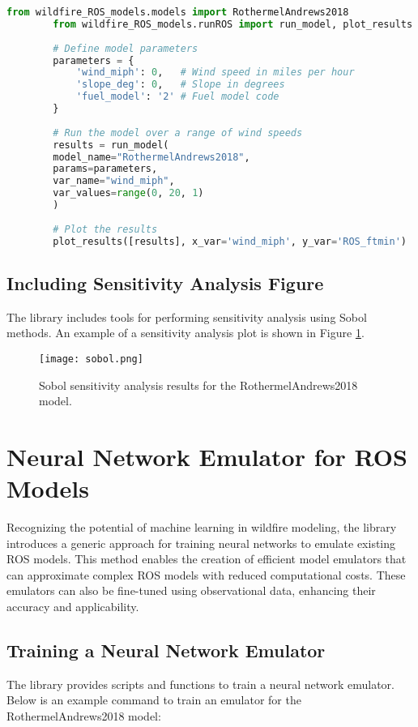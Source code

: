 \documentclass{article}
\begin{document}
	\begin{lstlisting}[language=Python, caption=Running a ROS model and plotting results]
		from wildfire_ROS_models.models import RothermelAndrews2018
		from wildfire_ROS_models.runROS import run_model, plot_results
		
		# Define model parameters
		parameters = {
			'wind_miph': 0,   # Wind speed in miles per hour
			'slope_deg': 0,   # Slope in degrees
			'fuel_model': '2' # Fuel model code
		}
		
		# Run the model over a range of wind speeds
		results = run_model(
		model_name="RothermelAndrews2018",
		params=parameters,
		var_name="wind_miph",
		var_values=range(0, 20, 1)
		)
		
		# Plot the results
		plot_results([results], x_var='wind_miph', y_var='ROS_ftmin')
	\end{lstlisting}
	
	\subsection{Including Sensitivity Analysis Figure}
	The library includes tools for performing sensitivity analysis using Sobol methods. An example of a sensitivity analysis plot is shown in Figure \ref{fig:sobol}.
	
	\begin{figure}[h]
		\centering
		\texttt{[image: sobol.png]}
		\caption{Sobol sensitivity analysis results for the RothermelAndrews2018 model.}
		\label{fig:sobol}
	\end{figure}
	
	\section{Neural Network Emulator for ROS Models}
	Recognizing the potential of machine learning in wildfire modeling, the library introduces a generic approach for training neural networks to emulate existing ROS models. This method enables the creation of efficient model emulators that can approximate complex ROS models with reduced computational costs. These emulators can also be fine-tuned using observational data, enhancing their accuracy and applicability.
	
	\subsection{Training a Neural Network Emulator}
	The library provides scripts and functions to train a neural network emulator. Below is an example command to train an emulator for the RothermelAndrews2018 model:
	
\end{document}
